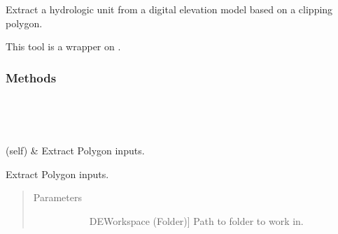 \documentclass[letterpaper,10pt,english]{sphinxmanual}
\begin{document}
\begin{fulllineitems}
\label{\detokenize{StreamStats_DataPrep:StreamStats_DataPrep.ExtractPoly}}
Extract a hydrologic unit from a digital elevation model based on a clipping polygon.

This tool is a wrapper on {\hyperref[\detokenize{elevationTools:elevationTools.extractPoly}]{}}.
\subsubsection*{Methods}


\begin{savenotes}\sphinxatlongtablestart\begin{longtable}{}
\hline

\endfirsthead

%
{}\\
\hline

\endhead

\hline
{}\\
\endfoot

\endlastfoot

{\hyperref[\detokenize{StreamStats_DataPrep:StreamStats_DataPrep.ExtractPoly.getParameterInfo}]{}}(self)
&
Extract Polygon inputs.
\\
\hline
\end{longtable}\sphinxatlongtableend\end{savenotes}

\begin{fulllineitems}
\label{\detokenize{StreamStats_DataPrep:StreamStats_DataPrep.ExtractPoly.getParameterInfo}}
Extract Polygon inputs.
\begin{quote}\begin{description}
\item[{Parameters}] \leavevmode\begin{description}
\item[{}] \leavevmode{[}DEWorkspace (Folder){]}
Path to folder to work in.


\end{description}
\end{description}
\end{quote}
\end{fulllineitems}
\end{fulllineitems}
\end{document}
